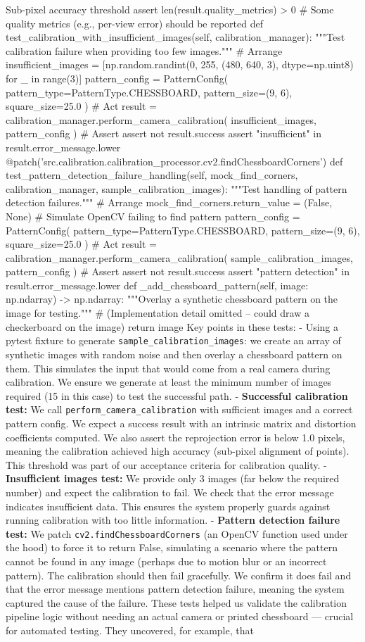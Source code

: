 Sub-pixel accuracy threshold assert len(result.quality_metrics) > 0 # Some quality metrics (e.g., per-view error) should be reported def test_calibration_with_insufficient_images(self, calibration_manager): """Test calibration failure when providing too few images.""" # Arrange insufficient_images = [np.random.randint(0, 255, (480, 640, 3), dtype=np.uint8) for _ in range(3)] pattern_config = PatternConfig( pattern_type=PatternType.CHESSBOARD, pattern_size=(9, 6), square_size=25.0 ) # Act result = calibration_manager.perform_camera_calibration( insufficient_images, pattern_config ) # Assert assert not result.success assert "insufficient" in result.error_message.lower @patch('src.calibration.calibration_processor.cv2.findChessboardCorners') def test_pattern_detection_failure_handling(self, mock_find_corners, calibration_manager, sample_calibration_images): """Test handling of pattern detection failures.""" # Arrange mock_find_corners.return_value = (False, None) # Simulate OpenCV failing to find pattern pattern_config = PatternConfig( pattern_type=PatternType.CHESSBOARD, pattern_size=(9, 6), square_size=25.0 ) # Act result = calibration_manager.perform_camera_calibration( sample_calibration_images, pattern_config ) # Assert assert not result.success assert "pattern detection" in result.error_message.lower def _add_chessboard_pattern(self, image: np.ndarray) -> np.ndarray: """Overlay a synthetic chessboard pattern on the image for testing.""" # (Implementation detail omitted – could draw a checkerboard on the image) return image Key points in these tests: - Using a pytest fixture to generate \texttt{sample_calibration_images}: we create an array of synthetic images with random noise and then overlay a chessboard pattern on them. This simulates the input that would come from a real camera during calibration. We ensure we generate at least the minimum number of images required (15 in this case) to test the successful path. - \textbf{Successful calibration test:} We call \texttt{perform_camera_calibration} with sufficient images and a correct pattern config. We expect a success result with an intrinsic matrix and distortion coefficients computed. We also assert the reprojection error is below 1.0 pixels, meaning the calibration achieved high accuracy (sub-pixel alignment of points). This threshold was part of our acceptance criteria for calibration quality. - \textbf{Insufficient images test:} We provide only 3 images (far below the required number) and expect the calibration to fail. We check that the error message indicates insufficient data. This ensures the system properly guards against running calibration with too little information. - \textbf{Pattern detection failure test:} We patch \texttt{cv2.findChessboardCorners} (an OpenCV function used under the hood) to force it to return False, simulating a scenario where the pattern cannot be found in any image (perhaps due to motion blur or an incorrect pattern). The calibration should then fail gracefully. We confirm it does fail and that the error message mentions pattern detection failure, meaning the system captured the cause of the failure. These tests helped us validate the calibration pipeline logic without needing an actual camera or printed chessboard --- crucial for automated testing. They uncovered, for example, that 
